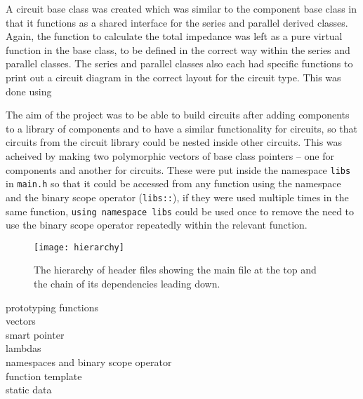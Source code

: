 A circuit base class was created which was similar to the component base class in that it functions as a shared interface for the series and parallel derived classes. Again, the function to calculate the total impedance was left as a pure virtual function in the base class, to be defined in the correct way within the series and parallel classes. The series and parallel classes also each had specific functions to print out a circuit diagram in the correct layout for the circuit type. This was done using

The aim of the project was to be able to build circuits after adding components to a library of components and to have a similar functionality for circuits, so that circuits from the circuit library could be nested inside other circuits. This was acheived by making two polymorphic vectors of base class pointers -- one for components and another for circuits. These were put inside the namespace \verb!libs! in \verb!main.h! so that it could be accessed from any function using the namespace and the binary scope operator (\verb!libs::!), if they were used multiple times in the same function, \verb!using namespace libs! could be used once to remove the need to use the binary scope operator repeatedly within the relevant function.



\begin{figure}
  \begin{center}
    \texttt{[image: hierarchy]}
  \end{center}
  \caption{The hierarchy of header files showing the main file at the top and the chain of its dependencies leading down.}
  \label{fig:hierarchy}
\end{figure}









prototyping functions\\

vectors\\
smart pointer\\
lambdas\\
namespaces and binary scope operator\\
function template\\
static data\\
